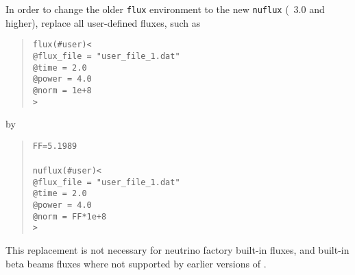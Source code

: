 \begin{appendix}
In order to change the older {\tt flux} environment to the
new {\tt nuflux} (\GLOBES\ 3.0 and higher), replace all user-defined fluxes, such as
\begin{quote}
{\tt flux(\#user)<}\\
{\tt \tb @flux\_file = "user\_file\_1.dat"\\
\tb @time = 2.0\\
\tb @power = 4.0\\
\tb @norm = 1e+8}\\
{\tt >}
\end{quote}
by
\begin{quote}
{\tt FF=5.1989} \\
\\
{\tt nuflux(\#user)<}\\
{\tt \tb @flux\_file = "user\_file\_1.dat"\\
\tb @time = 2.0\\
\tb @power = 4.0\\
\tb @norm = FF*1e+8}\\
{\tt >}
\end{quote}

This replacement is not necessary for neutrino factory built-in fluxes,
and built-in beta beams fluxes where not supported by earlier versions
of \GLOBES .




{\footnotesize



}


\end{appendix}

